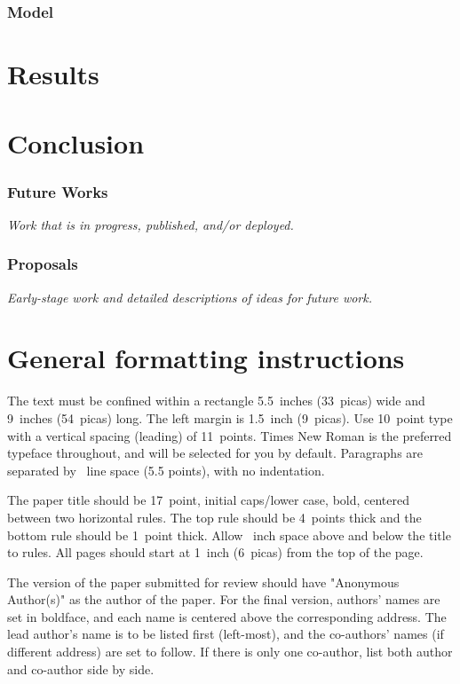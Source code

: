 \documentclass{article}
\begin{document}
\subsubsection{Model}

\section{Results}

\section{Conclusion}

\subsubsection{Future Works}



\textit{Work that is in progress, published, and/or deployed.}

\subsubsection{Proposals}

\textit{Early-stage work and detailed descriptions of ideas for future work.}

\section{General formatting instructions}
\label{gen_inst}

The text must be confined within a rectangle 5.5~inches (33~picas) wide and
9~inches (54~picas) long. The left margin is 1.5~inch (9~picas).  Use 10~point
type with a vertical spacing (leading) of 11~points.  Times New Roman is the
preferred typeface throughout, and will be selected for you by default.
Paragraphs are separated by ~line space (5.5 points), with no
indentation.

The paper title should be 17~point, initial caps/lower case, bold, centered
between two horizontal rules. The top rule should be 4~points thick and the
bottom rule should be 1~point thick. Allow ~inch space above and
below the title to rules. All pages should start at 1~inch (6~picas) from the
top of the page.

The version of the paper submitted for review should have "Anonymous Author(s)" as the author of the paper. 
For the final version, authors' names are set in boldface, and each name is
centered above the corresponding address. The lead author's name is to be listed
first (left-most), and the co-authors' names (if different address) are set to
follow. If there is only one co-author, list both author and co-author side by
side.
\end{document}

